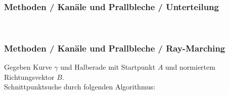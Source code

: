 \documentclass[8pt, aspectratio=169]{beamer}
\begin{document}
\begin{frame}
	\frametitle{Methoden / Kanäle und Prallbleche / Unterteilung}
	\vspace{-1cm}\hspace{-0.5cm}
	\\[0.5em]
	\begin{figure}
		\centering
		\begin{subfigure}[t]{.5\textwidth}
			
		\end{subfigure}
	\end{figure}
\end{frame}

\begin{frame}
	\frametitle{Methoden / Kanäle und Prallbleche / Ray-Marching}
	\hspace{-0.5cm}
	Gegeben Kurve $\gamma$ und Halberade mit Startpunkt $A$ und normiertem Richtungsvektor $B$.\\
	Schnittpunktsuche durch folgenden Algorithmus:
	\begin{minipage}{\textwidth}
		\begin{figure}[H]
			\centering
			
		\end{figure}
	\end{minipage}
\end{frame}
\end{document}

